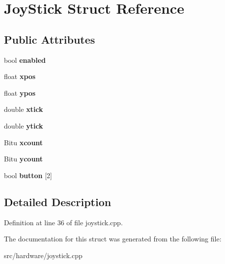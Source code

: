 \hypertarget{structJoyStick}{\section{Joy\-Stick Struct Reference}
\label{structJoyStick}
}
\subsection*{Public Attributes}
\begin{DoxyCompactItemize}
\item 
\hypertarget{structJoyStick_ad00ef5c4460bdfa8a56361947f52fc82}{bool {\bfseries enabled}}\label{structJoyStick_ad00ef5c4460bdfa8a56361947f52fc82}

\item 
\hypertarget{structJoyStick_a6bb3911286d340f8b6374349fe22c7bc}{float {\bfseries xpos}}\label{structJoyStick_a6bb3911286d340f8b6374349fe22c7bc}

\item 
\hypertarget{structJoyStick_a73773b118b8a449518e3e7e95086df86}{float {\bfseries ypos}}\label{structJoyStick_a73773b118b8a449518e3e7e95086df86}

\item 
\hypertarget{structJoyStick_acaf5615f3fd13d5a6a4373475e3f2ceb}{double {\bfseries xtick}}\label{structJoyStick_acaf5615f3fd13d5a6a4373475e3f2ceb}

\item 
\hypertarget{structJoyStick_a422bb54e6c70bba317c47b5836a92f74}{double {\bfseries ytick}}\label{structJoyStick_a422bb54e6c70bba317c47b5836a92f74}

\item 
\hypertarget{structJoyStick_a7d9ee7817800fc4da0dd297471b5c52e}{Bitu {\bfseries xcount}}\label{structJoyStick_a7d9ee7817800fc4da0dd297471b5c52e}

\item 
\hypertarget{structJoyStick_a11efb9cede12e8f632ac47fa27cb53d4}{Bitu {\bfseries ycount}}\label{structJoyStick_a11efb9cede12e8f632ac47fa27cb53d4}

\item 
\hypertarget{structJoyStick_a13281e72e655e40520a4f0e6518bdbb4}{bool {\bfseries button} \mbox{[}2\mbox{]}}\label{structJoyStick_a13281e72e655e40520a4f0e6518bdbb4}

\end{DoxyCompactItemize}


\subsection{Detailed Description}


Definition at line 36 of file joystick.\-cpp.



The documentation for this struct was generated from the following file\-:\begin{DoxyCompactItemize}
\item 
src/hardware/joystick.\-cpp\end{DoxyCompactItemize}
